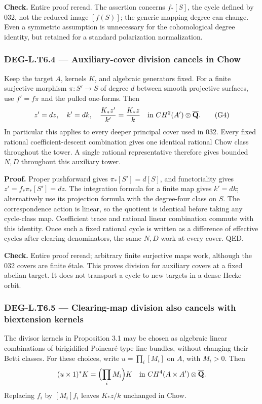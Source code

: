 \documentclass[11pt,a4paper]{article}
\theoremstyle{definition}
\begin{document}
\textbf{Check.} Entire proof reread. The assertion concerns \(f_*[S]\), the cycle defined by 032, not the reduced image \([f(S)]\); the generic mapping degree can change. Even a symmetric assumption is unnecessary for the cohomological degree identity, but retained for a standard polarization normalization.

\subsubsection{DEG-L.T6.4 --- Auxiliary-cover division cancels in Chow}\label{DEG-L.T6.4}

Keep the target \(A\), kernels \(K\), and algebraic generators fixed. For a finite surjective morphism \(\pi:S'\to S\) of degree \(d\) between smooth projective surfaces, use \(f'=f\pi\) and the pulled one-forms. Then \[
z'=d z,\quad k'=d k,\quad {K_*z'\over k'}={K_*z\over k}
\quad\hbox{in }CH^2(A')\otimes\overline{\mathbf Q}.
\tag{G4}
\] In particular this applies to every deeper principal cover used in 032. Every fixed rational coefficient-descent combination gives one identical rational Chow class throughout the tower. A single rational representative therefore gives bounded \(N,D\) throughout this auxiliary tower.

\textbf{Proof.} Proper pushforward gives \(\pi_*[S']=d[S]\), and functoriality gives \(z'=f_*\pi_*[S']=dz\). The integration formula for a finite map gives \(k'=dk\); alternatively use its projection formula with the degree-four class on \(S\). The correspondence action is linear, so the quotient is identical before taking any cycle-class map. Coefficient trace and rational linear combination commute with this identity. Once such a fixed rational cycle is written as a difference of effective cycles after clearing denominators, the same \(N,D\) work at every cover. QED.

\textbf{Check.} Entire proof reread; arbitrary finite surjective maps work, although the 032 covers are finite étale. This proves division for auxiliary covers at a fixed abelian target. It does not transport a cycle to new targets in a dense Hecke orbit.

\subsubsection{DEG-L.T6.5 --- Clearing-map division also cancels with biextension kernels}\label{DEG-L.T6.5}

The divisor kernels in Proposition 3.1 may be chosen as algebraic linear combinations of birigidified Poincaré-type line bundles, without changing their Betti classes. For these choices, write \(u=\prod_i[M_i]\) on \(A\), with \(M_i>0\). Then \[
(u\times1)^*K=\Bigl(\prod_i M_i\Bigr)K
\quad\hbox{in }CH^4(A\times A')\otimes\overline{\mathbf Q}.
\] Replacing \(f_i\) by \([M_i]f_i\) leaves \(K_*z/k\) unchanged in Chow.
\end{document}
